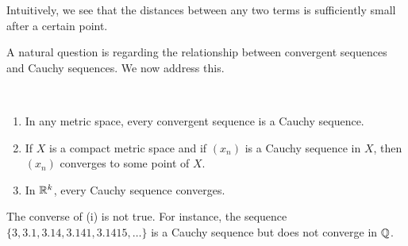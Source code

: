 \begin{remark}
Intuitively, we see that the distances between any two terms is sufficiently small after a certain point.
\end{remark}

A natural question is regarding the relationship between convergent sequences and Cauchy sequences. We now address this.

\begin{proposition} \
\begin{enumerate}[label=(\roman*)]
\item In any metric space, every convergent sequence is a Cauchy sequence.
\item If $X$ is a compact metric space and if $(x_n)$ is a Cauchy sequence in $X$, then $(x_n)$ converges to some point of $X$.
\item In $\mathbb R^k$, every Cauchy sequence converges. 
\end{enumerate}
\end{proposition}

\begin{remark}
The converse of (i) is not true. For instance, the sequence $\{3,3.1,3.14,3.141,3.1415,\dots\}$ is a Cauchy sequence but does not converge in $\mathbb Q$.
\end{remark}

